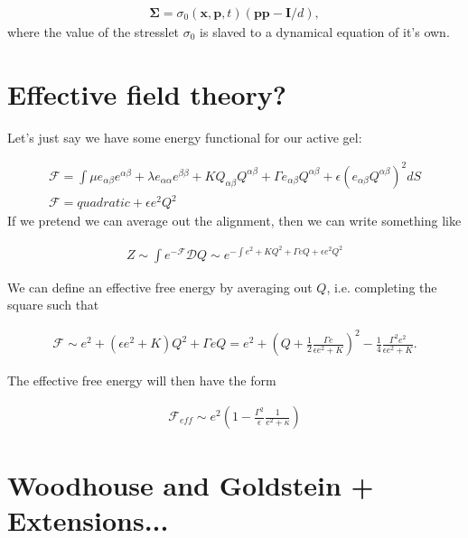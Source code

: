 \documentclass[onecolumn,showpacs,preprintnumbers,prl,amsmath,amssymb]{revtex4-1}
\def\b{\mathbf}
\begin{document}
\begin{gather}
\b{\Sigma}=\sigma_0(\b{x},\b{p},t)\left(\b{pp}-\b{I}/d\right),
\end{gather}
where the value of the stresslet $\sigma_0$ is slaved to a dynamical equation of it's own.

\section{Effective field theory?}


Let's just say we have some energy functional for our active gel:

\begin{gather}
\mathcal{F}=\int{\mu e_{\alpha\beta}e^{\alpha\beta}+\lambda e_{\alpha\alpha}e^{\beta\beta}+K Q_{\alpha\beta}Q^{\alpha\beta}+\Gamma e_{\alpha\beta}Q^{\alpha\beta}+\epsilon (e_{\alpha\beta}Q^{\alpha\beta})^2}dS\\
\mathcal{F}=quadratic+ \epsilon e^2Q^2
\end{gather}
If we pretend we can average out the alignment, then we can write something like

\begin{gather}
Z\sim \int{e^{-\mathcal{F}}}\mathcal{D}Q\sim e^{-\int{e^2+KQ^2+\Gamma e Q+\epsilon e^2 Q^2}}
\end{gather}

We can define an effective free energy by averaging out $Q$, i.e. completing the square such that

\begin{gather}
\mathcal{F}\sim e^2+(\epsilon e^2+K)Q^2+\Gamma e Q=e^2+(Q+\frac{1}{2}\frac{\Gamma e}{\epsilon e^2+K})^2-\frac{1}{4}\frac{\Gamma^2e^2}{\epsilon e^2+K}.
\end{gather}

The effective free energy will then have the form

\begin{gather}
\mathcal{F}_{eff}\sim e^2\left(1-\frac{\Gamma^2}{\epsilon}\frac{1}{e^2+\kappa}\right)
\end{gather}




\section{Woodhouse and Goldstein + Extensions...}
\end{document}
